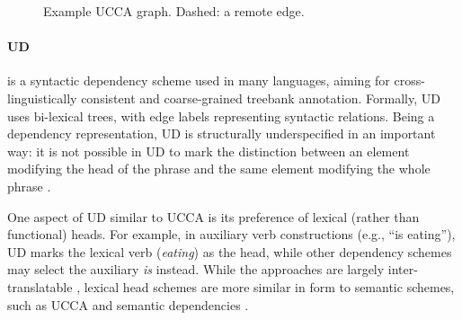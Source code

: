 \documentclass[11pt,a4paper,table]{article}
\begin{document}
\begin{figure}[th]
  \centering
\caption{\label{fig:example_ucca}
 Example UCCA graph. Dashed: a remote edge.}
\end{figure}



\paragraph{UD}\label{sec:ud}
is a syntactic dependency scheme used in many languages,
aiming for cross-linguistically consistent and coarse-grained treebank
annotation. Formally, UD uses bi-lexical trees, with edge labels 
representing syntactic relations.
Being a dependency representation, UD is structurally underspecified in an important way:
​it is not possible in UD to mark the distinction between an element modifying the head of
the phrase and the same element modifying the whole phrase
\cite{doi:10.1146/annurev-linguistics-011718-011842}.

  One aspect of UD similar to UCCA is its preference of lexical (rather than functional) heads.
  For example, in auxiliary verb constructions (e.g., ``is eating''), UD
  marks the lexical verb (\textit{eating}) as the head, while other dependency schemes
  may select the auxiliary \textit{is} instead.
  While the approaches are largely inter-translatable
  \citep{Schwartz:12}, lexical head schemes are more similar in form to semantic schemes,
   such as UCCA and semantic dependencies \citep{oepen2016towards}.
   
\end{document}
